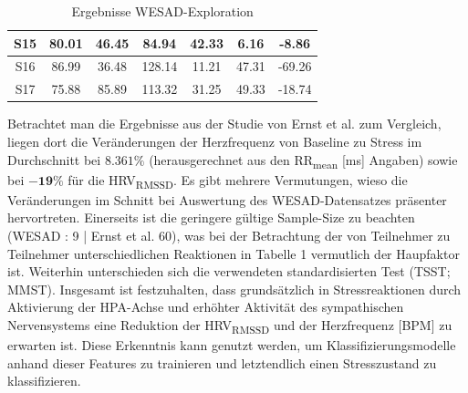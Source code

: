 \begin{table}[hp]
\begin{tabular}{ccccccc}
    \multicolumn{1}{|c|}{S15}                                                         & \multicolumn{1}{c|}{80.01}                                      & \multicolumn{1}{c|}{46.45}                                   & \multicolumn{1}{c|}{84.94}                                    & \multicolumn{1}{c|}{42.33}                                    & \multicolumn{1}{c|}{6.16}                                     & \multicolumn{1}{c|}{-8.86}                                     \\ \hline
    \multicolumn{1}{|c|}{S16}                                                         & \multicolumn{1}{c|}{86.99}                                      & \multicolumn{1}{c|}{36.48}                                   & \multicolumn{1}{c|}{128.14}                                   & \multicolumn{1}{c|}{11.21}                                    & \multicolumn{1}{c|}{47.31}                                    & \multicolumn{1}{c|}{-69.26}                                    \\ \hline
    \multicolumn{1}{|c|}{S17}                                                         & \multicolumn{1}{c|}{75.88}                                      & \multicolumn{1}{c|}{85.89}                                   & \multicolumn{1}{c|}{113.32}                                   & \multicolumn{1}{c|}{31.25}                                    & \multicolumn{1}{c|}{49.33}                                    & \multicolumn{1}{c|}{-18.74}                                    \\ \hline
\end{tabular}
\caption{Ergebnisse WESAD-Exploration}
\label{tab:wesad_werte}
\end{table}

Betrachtet man die Ergebnisse aus der Studie von Ernst et al. \cite{Ernst2023} zum Vergleich, liegen dort die Veränderungen der Herzfrequenz von Baseline zu Stress im Durchschnitt bei $\mathbf{8.361\%}$ (herausgerechnet aus den RR\textsubscript{mean} [ms] Angaben) sowie bei 
$\mathbf{-19\%}$ für die HRV\textsubscript{RMSSD}. Es gibt mehrere Vermutungen, wieso die Veränderungen im Schnitt bei Auswertung des WESAD-Datensatzes präsenter hervortreten. Einerseits ist die geringere gültige Sample-Size zu beachten (WESAD : 9 | Ernst et al. 60), was bei der Betrachtung der 
von Teilnehmer zu Teilnehmer unterschiedlichen Reaktionen in Tabelle 1 vermutlich der Haupfaktor ist. Weiterhin unterschieden sich die verwendeten standardisierten Test (\ac{TSST}; \ac{MMST}). Insgesamt ist festzuhalten, dass grundsätzlich in Stressreaktionen durch Aktivierung der \ac{HPA-Achse} und erhöhter
Aktivität des sympathischen Nervensystems eine Reduktion der HRV\textsubscript{RMSSD} und der Herzfrequenz [BPM] zu erwarten ist. Diese Erkenntnis kann genutzt werden, um Klassifizierungsmodelle anhand dieser Features zu trainieren und letztendlich einen Stresszustand zu klassifizieren.

